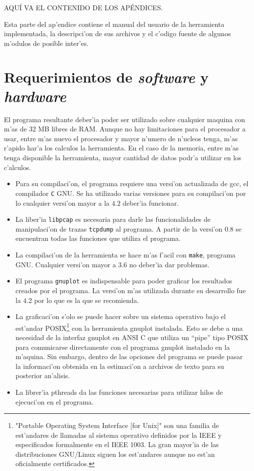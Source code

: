 AQU\'I VA EL CONTENIDO DE LOS AP\'ENDICES.
\vspace{5 mm}

Esta parte del ap'endice contiene el manual del usuario de la herramienta
implementada, la descripci'on de sus archivos y el c'odigo fuente de algunos
m'odulos de posible inter'es.

\section{Requerimientos de {\it software} y {\it hardware}}
\label{sect:hardsoftrequirements}

El programa resultante deber'ia poder ser utilizado sobre cualquier maquina 
con m'as de 32 MB libres de RAM. Aunque no hay limitaciones para el procesador
a usar, entre m'as nuevo el procesador y mayor n'umero de n'ucleos tenga, m'as
r'apido har'a los calculos la herramienta. En el caso de la memoria, entre 
m'as tenga disponible la herramienta, mayor cantidad de datos podr'a utilizar 
en los c'alculos.

\begin{itemize}
\item Para su compilaci'on, el programa requiere una versi'on actualizada de
gcc, el compilador {\tt C} GNU. Se ha utilizado varias versiones para su
compilaci'on por lo cualquier versi'on mayor a la $4.2$ deber'ia funcionar.
\item La liber'ia {\tt libpcap} es necesaria para darle las funcionalidades de
manipulaci'on de trazas {\tt tcpdump} al programa. A partir de la versi'on
$0.8$ se encuentran todas las funciones que utiliza el programa.
\item La compilaci'on de la herramienta se hace m'as f'acil con {\tt make},
programa GNU. Cualquier versi'on mayor a $3.6$ no deber'ia dar problemas.
\item El programa {\tt gnuplot} es indispensable para poder graficar los
resultados creados por el programa. La versi'on m'as utilizada durante su
desarrollo fue la $4.2$ por lo que es la que se recomienda.
\item La graficaci'on s'olo se puede hacer sobre un sistema operativo bajo el
est'andar POSIX\footnote{"Portable Operating System Interface [for Unix]" son
una familia de est'andares de llamadas al sistema operativo definidos por la
IEEE y especificados formalmente en el IEEE 1003. La gran mayor'ia de las
distribuciones GNU/Linux siguen los est'andares aunque no est'an
oficialmente certificados.} con la herramienta gnuplot instalada. Esto se debe
a una necesidad de la interfaz gnuplot en ANSI C que utiliza un ``pipe'' tipo
POSIX para comunicarse directamente con el programa gnuplot instalado en la
m'aquina. Sin embargo, dentro de las opciones del programa se puede pasar la
informaci'on obtenida en la estimaci'on a archivos de texto para su posterior
an'alisis.
\item La librer'ia pthreads da las funciones necesarias para utilizar hilos
de ejecuci'on en el programa.
\end{itemize}

